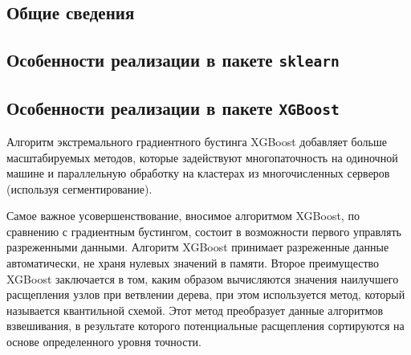 \documentclass[%
	11pt,
	a4paper,
	utf8,
		]{article}
\begin{document}
\subsection{Общие сведения}

\subsection{Особенности реализации в пакете \texttt{sklearn}}

\subsection{Особенности реализации в пакете \texttt{XGBoost}}

Алгоритм экстремального градиентного бустинга XGBoost добавляет больше масштабируемых методов, которые задействуют многопаточность на одиночной машине и параллельную обработку на кластерах из многочисленных серверов (используя сегментирование).

Самое важное усовершенствование, вносимое алгоритмом XGBoost, по сравнению с градиентным бустингом, состоит в возможности первого управлять разреженными данными. Алгоритм XGBoost принимает разреженные данные автоматически, не храня нулевых значений в памяти. Второе преимущество XGBoost заключается в том, каким образом вычисляются значения наилучшего расщепления узлов при ветвлении дерева, при этом используется метод, который называется квантильной схемой. Этот метод преобразует данные алгоритмов взвешивания, в результате которого потенциальные расщепления сортируются на основе определенного уровня точности.
\end{document}

